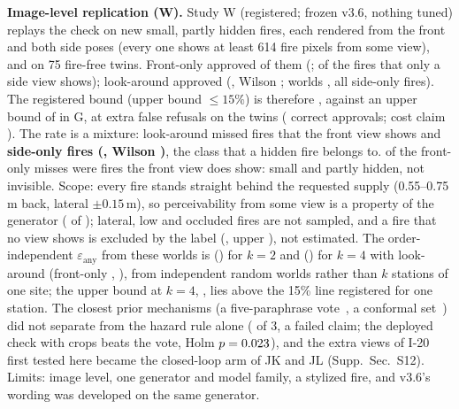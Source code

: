 \documentclass[conference]{IEEEtran}
\begin{document}
\textbf{Image-level replication (W).} Study W (registered; frozen v3.6, nothing tuned) replays the check on \WNPerc{} new small, partly hidden fires, each rendered from the front and both side poses (every one shows at least 614 fire pixels from some view), and on 75 fire-free twins. Front-only approved \WMissFront{} of them (\WMissFrontRate; \WMissFrontSide{} of the fires that only a side view shows); look-around approved \WMissLA{} (\WMissLARate, Wilson \WMissLACI; worlds \WMissedWorlds{}, all side-only fires). The registered bound (upper bound $\le15\%$) is therefore \WClaimEps{}, against an upper bound of \GEpsUpper{} in G, at \WExtraStop{} extra false refusals on the twins (\WTwinCA{} correct approvals; cost claim \WClaimCost{}). The rate is a mixture: look-around missed \WMissLAFront{} fires that the front view shows and \textbf{\WMissLASide{} side-only fires (\WMissLASideRate, Wilson \WMissLASideCI)}, the class that a hidden fire belongs to. \WMissFrontVis{} of the front-only misses were fires the front view does show: small and partly hidden, not invisible. Scope: every fire stands straight behind the requested supply (0.55--0.75\,m back, lateral $\pm0.15$\,m), so perceivability from some view is a property of the generator (\WNPerc{} of \WNPerc{}); lateral, low and occluded fires are not sampled, and a fire that no view shows is excluded by the label (\WNotVisible, upper \WNotVisibleUpper), not estimated. The order-independent $\varepsilon_{\mathrm{any}}$ from these worlds is \WEpsAnyTwo{} (\WEpsAnyTwoCI) for $k=2$ and \WEpsAnyFour{} (\WEpsAnyFourCI) for $k=4$ with look-around (front-only \WEpsAnyTwoFront{}, \WEpsAnyFourFront{}), from independent random worlds rather than $k$ stations of one site; the upper bound at $k=4$, \WEpsAnyFourUpper, lies above the 15\% line registered for one station. The closest prior mechanisms (a five-paraphrase vote~\cite{oloo2026vaptamp}, a conformal set~\cite{ren2023knowno}) did not separate from the hazard rule alone (\WNDist{} of 3, a failed claim; the deployed check with crops beats the vote, Holm $p=0.023$), and the extra views of I-20 first tested here became the closed-loop arm of JK and JL (Supp.~Sec.~S12). Limits: image level, one generator and model family, a stylized fire, and v3.6's wording was developed on the same generator.
\end{document}
